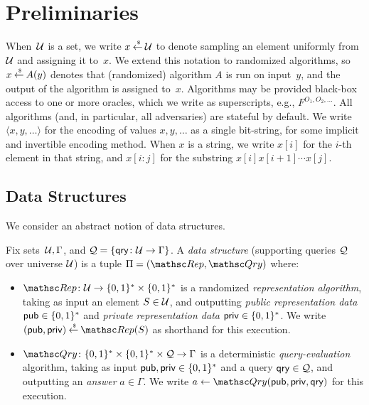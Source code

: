 \newcommand{\qry}{\mathsf{qry}}
\section{Preliminaries}

When~${\cal U}$ is a set, we write $x {\:\stackrel{{\scriptscriptstyle \hspace{0.2em}\$}} {\leftarrow}\:} {\cal U}$ to denote sampling
an element uniformly from~${\cal U}$ and assigning it to~$x$. We extend
this notation to randomized algorithms, so $x {\:\stackrel{{\scriptscriptstyle \hspace{0.2em}\$}} {\leftarrow}\:} A(y)$ denotes
that (randomized) algorithm $A$ is run on input~$y$, and the output
of the algorithm is assigned to~$x$. Algorithms may be provided
black-box access to one or more oracles, which we write as
superscripts, e.g., $F^{O_1,O_2,\ldots}$.  All algorithms (and, in
particular, all adversaries) are stateful by default. We write
$\langle x,y,\ldots \rangle$ for the encoding of values $x,y,\ldots$
as a single bit-string, for some implicit and invertible encoding
method. When $x$ is a string, we write $x[i]$ for the $i$-th element
in that string, and $x[i:j]$ for the substring $x[i]x[i+1]\cdots
x[j]$.  

\subsection{Data Structures}

We consider an abstract notion of data structures.

\begin{definition} \rm
Fix sets~${\cal U}, \Gamma$, and $\calQ = \{\qry \colon \univ \to
\Gamma\}$. A \emph{data structure} (supporting queries ${\cal Q}$ over
universe ${\cal U}$) is a tuple $\setprim=(\Rep, \Qry)$ where:
\begin{itemize}
\item $\Rep \colon \univ \to \bits^* \times \bits^*$ is a
    randomized \emph{representation algorithm}, taking as input
    an element $S \in {\cal U}$,
    and outputting %
    \emph{public representation data} ${\sf pub} \in \{0,1\}^*$ and
    \emph{private representation data} ${\sf priv} \in \{0,1\}^*$.
    We write $(\pubaux,\privaux) \getsr \Rep(S)$ as shorthand
    for this execution.
\item $\Qry\colon \bits^* \times \bits^* \times \calQ \to
    \Gamma$ is a deterministic \emph{query-evaluation}
    algorithm, taking as input ${\sf pub},{\sf priv} \in \{0,1\}^*$
    and a query $\qry \in \calQ$, and outputting an
    \emph{answer} $a \in \Gamma$.  We write $a \gets
    \Qry(\pubaux,\privaux,\qry)$ for this execution. \hfill\dqed
\end{itemize}
\end{definition}

